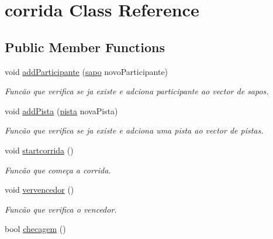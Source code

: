 \hypertarget{classcorrida}{}\section{corrida Class Reference}
\label{classcorrida}
\subsection*{Public Member Functions}
\begin{DoxyCompactItemize}
\item 
void \hyperlink{classcorrida_a46bfdcb763085a8ab1124932b391e263}{add\+Participante} (\hyperlink{classsapo}{sapo} novo\+Participante)
\begin{DoxyCompactList}\small\item\em Funcão que verifica se ja existe e adciona participante ao vector de sapos. \end{DoxyCompactList}\item 
void \hyperlink{classcorrida_a720626e46446acf7e6da5484e99f25b5}{add\+Pista} (\hyperlink{classpista}{pista} nova\+Pista)
\begin{DoxyCompactList}\small\item\em Funcão que verifica se ja existe e adciona uma pista ao vector de pistas. \end{DoxyCompactList}\item 
void \hyperlink{classcorrida_ae0555b6f7de517c30edacfe9ed4809eb}{startcorrida} ()\hypertarget{classcorrida_ae0555b6f7de517c30edacfe9ed4809eb}{}\label{classcorrida_ae0555b6f7de517c30edacfe9ed4809eb}

\begin{DoxyCompactList}\small\item\em Funcão que começa a corrida. \end{DoxyCompactList}\item 
void \hyperlink{classcorrida_a4b7364bcbd5cb375ccc4322459e77e55}{vervencedor} ()\hypertarget{classcorrida_a4b7364bcbd5cb375ccc4322459e77e55}{}\label{classcorrida_a4b7364bcbd5cb375ccc4322459e77e55}

\begin{DoxyCompactList}\small\item\em Funcão que verifica o vencedor. \end{DoxyCompactList}\item 
bool \hyperlink{classcorrida_af9ae71d567b28a5cc330088a3b4575c7}{checagem} ()\hypertarget{classcorrida_af9ae71d567b28a5cc330088a3b4575c7}{}\label{classcorrida_af9ae71d567b28a5cc330088a3b4575c7}


\end{DoxyCompactItemize}
